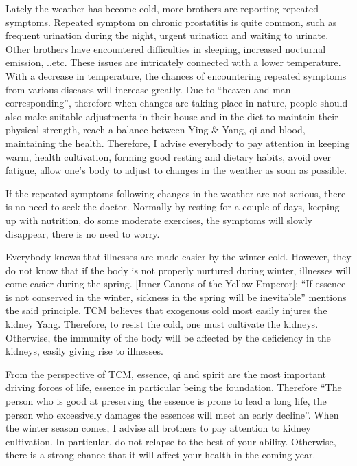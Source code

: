 \documentclass[
]{book}
\begin{document}
Lately the weather has become cold, more brothers are reporting repeated symptoms. Repeated symptom on chronic prostatitis is quite common, such as frequent urination during the night, urgent urination and waiting to urinate. Other brothers have encountered difficulties in sleeping, increased nocturnal emission, ..etc. These issues are intricately connected with a lower temperature. With a decrease in temperature, the chances of encountering repeated symptoms from various diseases will increase greatly. Due to ``heaven and man corresponding'', therefore when changes are taking place in nature, people should also make suitable adjustments in their house and in the diet to maintain their physical strength, reach a balance between Ying \& Yang, qi and blood, maintaining the health. Therefore, I advise everybody to pay attention in keeping warm, health cultivation, forming good resting and dietary habits, avoid over fatigue, allow one's body to adjust to changes in the weather as soon as possible.

If the repeated symptoms following changes in the weather are not serious, there is no need to seek the doctor. Normally by resting for a couple of days, keeping up with nutrition, do some moderate exercises, the symptoms will slowly disappear, there is no need to worry.

Everybody knows that illnesses are made easier by the winter cold. However, they do not know that if the body is not properly nurtured during winter, illnesses will come easier during the spring. {[}Inner Canons of the Yellow Emperor{]}: ``If essence is not conserved in the winter, sickness in the spring will be inevitable'' mentions the said principle. TCM believes that exogenous cold most easily injures the kidney Yang. Therefore, to resist the cold, one must cultivate the kidneys. Otherwise, the immunity of the body will be affected by the deficiency in the kidneys, easily giving rise to illnesses.

From the perspective of TCM, essence, qi and spirit are the most important driving forces of life, essence in particular being the foundation. Therefore ``The person who is good at preserving the essence is prone to lead a long life, the person who excessively damages the essences will meet an early decline''. When the winter season comes, I advise all brothers to pay attention to kidney cultivation. In particular, do not relapse to the best of your ability. Otherwise, there is a strong chance that it will affect your health in the coming year.
\end{document}
